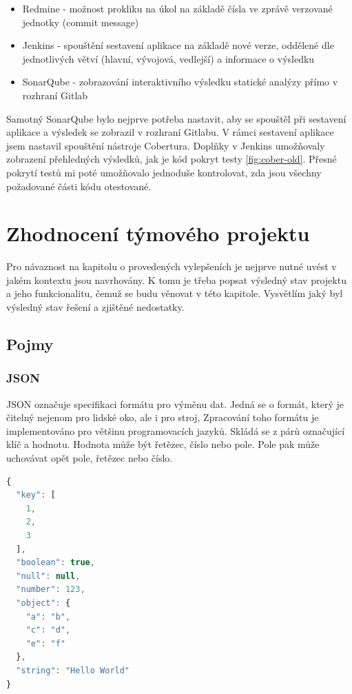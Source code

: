 \documentclass[thesis=B,czech]{FITthesis}[2012/06/26]
\begin{document}
\begin{itemize}
\item Redmine - možnost prokliku na úkol na základě čísla ve zprávě verzované jednotky (commit message)
\item Jenkins - spouštění sestavení aplikace na základě nové verze, oddělené dle jednotlivých větví (hlavní, vývojová, vedlejší) a
				informace o výsledku
\item SonarQube - zobrazování interaktivního výsledku statické analýzy přímo v rozhraní Gitlab
\end{itemize}

Samotný SonarQube bylo nejprve potřeba nastavit, aby se spouštěl při sestavení aplikace a výsledek se zobrazil v rozhraní
Gitlabu. V rámci sestavení aplikace jsem nastavil spouštění nástroje Cobertura.
Doplňky v Jenkins umožňovaly zobrazení přehledných výsledků, jak je kód pokryt testy \ref{fig:cober-old}. Přesné pokrytí testů mi poté umožňovalo 
jednoduše kontrolovat, zda jsou všechny požadované části kódu otestované.


\chapter{Zhodnocení týmového projektu}
Pro návaznost na kapitolu o provedených vylepšeních je nejprve nutné uvést v jakém kontextu jsou navrhovány. K tomu je třeba
popsat výsledný stav projektu a jeho funkcionalitu, čemuž se budu věnovat v této kapitole. Vysvětlím jaký byl výsledný stav
řešení a zjištěné nedostatky.

\section{Pojmy}

\subsection{JSON}
JSON označuje specifikaci formátu pro výměnu dat\cite{JSON}. Jedná se o formát, který je čitelný nejenom pro lidské oko, ale i pro stroj\cite{JSON},
Zpracování toho formátu je implementováno pro většinu programovacích jazyků\cite{JSON-impl}. Skládá se z párů označující
klíč a hodnotu. Hodnota může být řetězec, číslo nebo pole. Pole pak může uchovávat opět pole, řetězec nebo číslo. \cite{JSON}

\begin{lstlisting}[language=JavaScript, caption={Ukázka formátu JSON}]
{
  "key": [
    1,
    2,
    3
  ],
  "boolean": true,
  "null": null,
  "number": 123,
  "object": {
    "a": "b",
    "c": "d",
    "e": "f"
  },
  "string": "Hello World"
}
\end{lstlisting}
\end{document}
